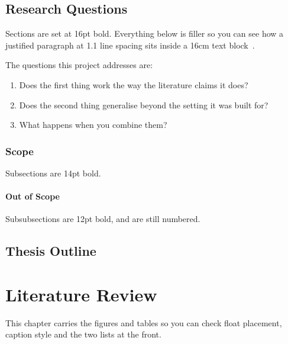 \documentclass[11pt,twoside,openany]{report}
\begin{document}
\lipsum[4]

\section{Research Questions}

Sections are set at 16pt bold. Everything below is filler so you can see how a
justified paragraph at 1.1 line spacing sits inside a 16cm text
block~\citep{lee2023conference,garcia2022book}.

\lipsum[5]

The questions this project addresses are:

\begin{enumerate}[itemsep=0.5ex]
  \item Does the first thing work the way the literature claims it does?
  \item Does the second thing generalise beyond the setting it was built for?
  \item What happens when you combine them?
\end{enumerate}

\subsection{Scope}

Subsections are 14pt bold.

\lipsum[6]

\subsubsection{Out of Scope}

Subsubsections are 12pt bold, and are still numbered.

\lipsum[7]

\section{Thesis Outline}

\lipsum[8]

\chapter{Literature Review}

This chapter carries the figures and tables so you can check float placement,
caption style and the two lists at the front.
\end{document}
